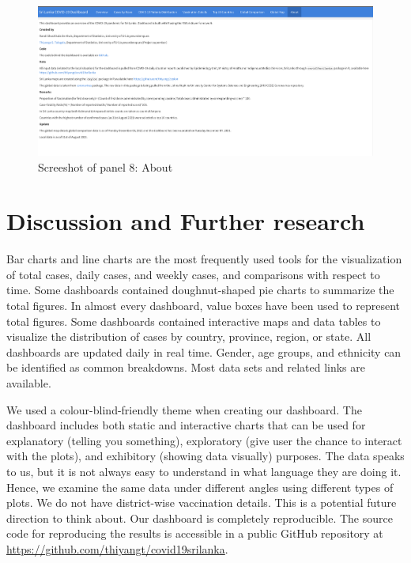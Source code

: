 \documentclass[
]{article}
\begin{document}
\begin{figure}

{\centering \includegraphics[width=0.8\linewidth]{Images/image8} 

}

\caption{Screeshot of panel 8: About}\label{fig:unnamed-chunk-12}
\end{figure}

\newpage

\hypertarget{conclusions}{%
\section{Discussion and Further research}\label{conclusions}}

Bar charts and line charts are the most frequently used tools for the
visualization of total cases, daily cases, and weekly cases, and
comparisons with respect to time. Some dashboards contained
doughnut-shaped pie charts to summarize the total figures. In almost
every dashboard, value boxes have been used to represent total figures.
Some dashboards contained interactive maps and data tables to visualize
the distribution of cases by country, province, region, or state. All
dashboards are updated daily in real time. Gender, age groups, and
ethnicity can be identified as common breakdowns. Most data sets and
related links are available.

We used a colour-blind-friendly theme when creating our dashboard. The
dashboard includes both static and interactive charts that can be used
for explanatory (telling you something), exploratory (give user the
chance to interact with the plots), and exhibitory (showing data
visually) purposes. The data speaks to us, but it is not always easy to
understand in what language they are doing it. Hence, we examine the
same data under different angles using different types of plots. We do
not have district-wise vaccination details. This is a potential future
direction to think about. Our dashboard is completely reproducible. The
source code for reproducing the results is accessible in a public GitHub
repository at \url{https://github.com/thiyangt/covid19srilanka}.
\end{document}
